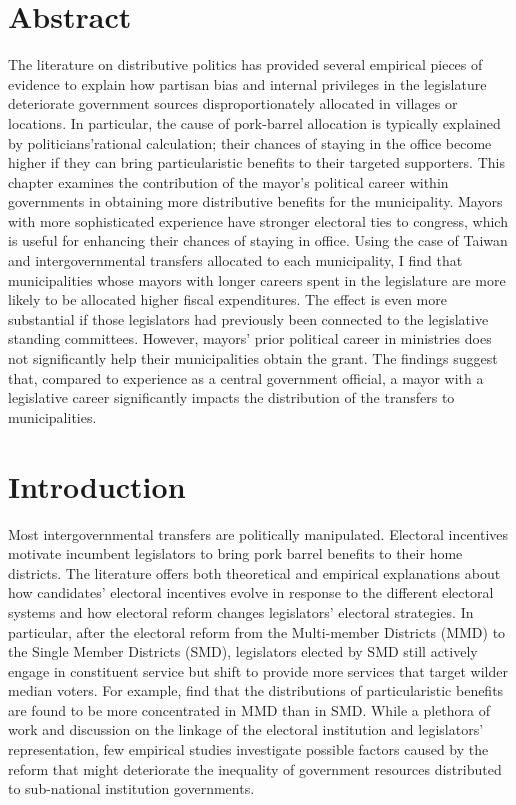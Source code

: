 \section*{\centering Abstract}

\small The literature on distributive politics has provided several empirical pieces of evidence to explain how partisan bias and internal privileges in the legislature deteriorate government sources disproportionately allocated in villages or locations. In particular, the cause of pork-barrel allocation is typically explained by politicians\textquoteright rational calculation; their chances of staying in the office become higher if they can bring particularistic benefits to their targeted supporters. This chapter examines the contribution of the mayor's political career within governments in obtaining more distributive benefits for the municipality. Mayors with more sophisticated experience have stronger electoral ties to congress, which is useful for enhancing their chances of staying in office. Using the case of Taiwan and intergovernmental transfers allocated to each municipality, I find that municipalities whose mayors with longer careers spent in the legislature are more likely to be allocated higher fiscal expenditures. The effect is even more substantial if those legislators had previously been connected to the legislative standing committees. However, mayors' prior political career in ministries does not significantly help their municipalities obtain the grant. The findings suggest that, compared to experience as a central government official, a mayor with a legislative career significantly impacts the distribution of the transfers to municipalities.

\clearpage

\section*{\centering Introduction}
Most intergovernmental transfers are politically manipulated. Electoral incentives motivate incumbent legislators to bring pork barrel benefits to their home districts. The literature offers both theoretical and empirical explanations about how candidates' electoral incentives evolve in response to the different electoral systems \citep[][]{Myerson1993, Cox1990} and how electoral reform changes legislators' electoral strategies. In particular, after the electoral reform from the Multi-member Districts (MMD) to the Single Member Districts (SMD), legislators elected by SMD still actively engage in constituent service but shift to provide more services that target wilder median voters. For example, \citet[][]{Hirano2006, McKean2000} find that the distributions of particularistic benefits are found to be more concentrated in MMD than in SMD. While a plethora of work and discussion on the linkage of the electoral institution and legislators' representation, few empirical studies investigate possible factors caused by the reform that might deteriorate the inequality of government resources distributed to sub-national institution governments.

